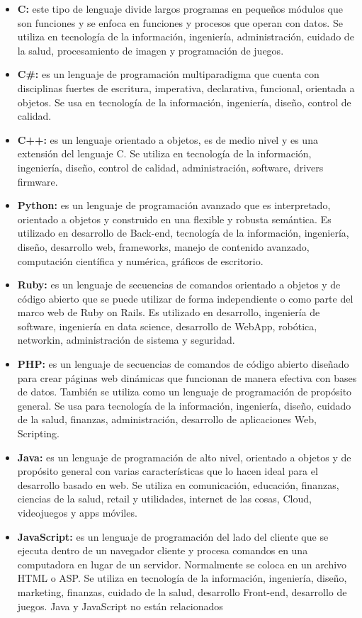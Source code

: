 \documentclass[11pt, letterpaper, spanish]{article}
\begin{document}
{\begin{itemize}
       \item{\textbf{C:} este tipo de lenguaje divide largos programas en pequeños módulos que son funciones y se enfoca en funciones y procesos que operan con datos. Se utiliza en tecnología de la información, ingeniería, administración, cuidado de la salud, procesamiento de imagen y programación de juegos. }
       \item{\textbf{C\#:} es un lenguaje de programación multiparadigma que cuenta con disciplinas fuertes de escritura, imperativa, declarativa, funcional, orientada a objetos. Se usa en tecnología de la información, ingeniería, diseño, control de calidad.}
       \item{\textbf{C++:} es un lenguaje orientado a objetos, es de medio nivel y es una extensión del lenguaje C. Se utiliza en tecnología de la información, ingeniería, diseño, control de calidad, administración, software, drivers firmware. }
       \item{\textbf{Python:} es un lenguaje de programación avanzado que es interpretado, orientado a objetos y construido en una flexible y robusta semántica. Es utilizado en desarrollo de Back-end, tecnología de la información, ingeniería, diseño, desarrollo web, frameworks, manejo de contenido avanzado, computación científica y numérica, gráficos de escritorio.}
       \item{\textbf{Ruby:} es un lenguaje de secuencias de comandos orientado a objetos y de código abierto que se puede utilizar de forma independiente o como parte del marco web de Ruby on Rails. Es utilizado en desarrollo, ingeniería de software, ingeniería en data science, desarrollo de WebApp, robótica, networkin, administración de sistema y seguridad.}
       \item{\textbf{PHP:}  es un lenguaje de secuencias de comandos de código abierto diseñado para crear páginas web dinámicas que funcionan de manera efectiva con bases de datos. También se utiliza como un lenguaje de programación de propósito general. Se usa para tecnología de la información, ingeniería, diseño, cuidado de la salud, finanzas, administración, desarrollo de aplicaciones Web, Scripting.}
       \item{\textbf{Java:} es un lenguaje de programación de alto nivel, orientado a objetos y de propósito general con varias características que lo hacen ideal para el desarrollo basado en web. Se utiliza en comunicación, educación, finanzas, ciencias de la salud, retail y utilidades, internet de las cosas, Cloud, videojuegos y apps móviles.}
       \item{\textbf{JavaScript:} es un lenguaje de programación del lado del cliente que se ejecuta dentro de un navegador cliente y procesa comandos en una computadora en lugar de un servidor. Normalmente se coloca en un archivo HTML o ASP. Se utiliza en tecnología de la información, ingeniería, diseño, marketing, finanzas, cuidado de la salud, desarrollo Front-end, desarrollo de juegos. Java y JavaScript no están relacionados}
   \end{itemize}
}
\end{document}
